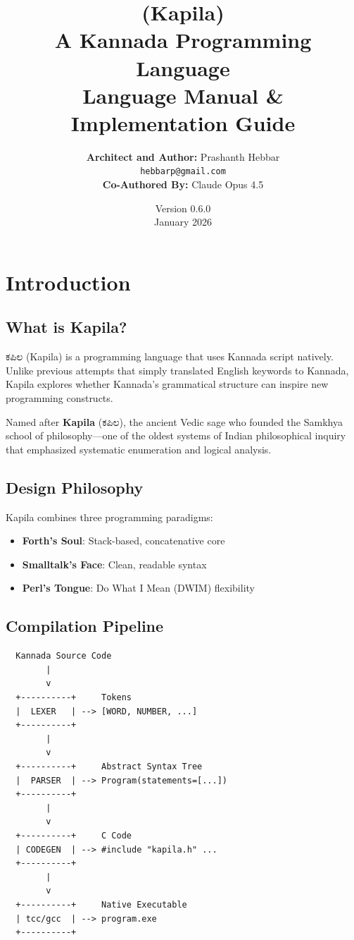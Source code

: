 \documentclass[11pt,a4paper]{report}
\title{
    \vspace{-1cm}
    {\Huge\bfseries\color{kapilacolor} \kannada{ಕಪಿಲ} (Kapila)}\\[0.5cm]
    {\Large A Kannada Programming Language}\\[1cm]
    {\large Language Manual \& Implementation Guide}
}
\author{
    \textbf{Architect and Author:} Prashanth Hebbar\\
    \texttt{hebbarp@gmail.com}\\[0.5cm]
    \textbf{Co-Authored By:} Claude Opus 4.5
}
\date{Version 0.6.0 \\ January 2026}
\newcommand{\kannada}[1]{{\kannadafont #1}}
\begin{document}
\maketitle
\tableofcontents

\chapter{Introduction}

\section{What is Kapila?}

\kannada{ಕಪಿಲ} (Kapila) is a programming language that uses Kannada script natively. Unlike previous attempts that simply translated English keywords to Kannada, Kapila explores whether Kannada's grammatical structure can inspire new programming constructs.

Named after \textbf{Kapila} (\kannada{ಕಪಿಲ}), the ancient Vedic sage who founded the Samkhya school of philosophy—one of the oldest systems of Indian philosophical inquiry that emphasized systematic enumeration and logical analysis.

\section{Design Philosophy}

Kapila combines three programming paradigms:

\begin{itemize}
    \item \textbf{Forth's Soul}: Stack-based, concatenative core
    \item \textbf{Smalltalk's Face}: Clean, readable syntax
    \item \textbf{Perl's Tongue}: Do What I Mean (DWIM) flexibility
\end{itemize}

\section{Compilation Pipeline}

\begin{verbatim}
  Kannada Source Code
        |
        v
  +----------+     Tokens
  |  LEXER   | --> [WORD, NUMBER, ...]
  +----------+
        |
        v
  +----------+     Abstract Syntax Tree
  |  PARSER  | --> Program(statements=[...])
  +----------+
        |
        v
  +----------+     C Code
  | CODEGEN  | --> #include "kapila.h" ...
  +----------+
        |
        v
  +----------+     Native Executable
  | tcc/gcc  | --> program.exe
  +----------+
\end{verbatim}
\end{document}
